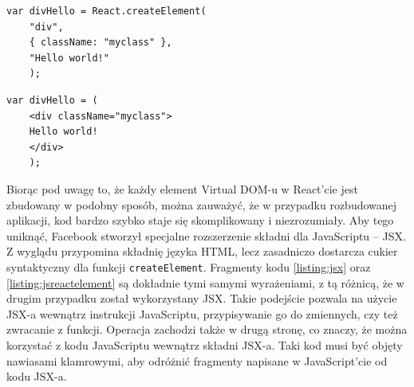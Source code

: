 \begin{minipage}{.45\textwidth}
	\begin{lstlisting}[caption=Javascript,style=JavaScript,label = listing:jsreactelement]
	var divHello = React.createElement(
	"div",
	{ className: "myclass" },
	"Hello world!"
	);
	\end{lstlisting}
\end{minipage}\hfill
\begin{minipage}{.45\textwidth}
	\begin{lstlisting}[caption=JSX,style=JavaScript,firstnumber=1,label = listing:jsx]
	var divHello = (
	<div className="myclass">
	Hello world!
	</div>
	);
	\end{lstlisting}
\end{minipage}

Biorąc pod uwagę to, że każdy element Virtual DOM-u w React'cie jest zbudowany w podobny sposób, można zauważyć, że w przypadku rozbudowanej aplikacji, kod bardzo szybko staje się skomplikowany i niezrozumiały. Aby tego uniknąć, Facebook stworzył specjalne rozszerzenie składni dla JavaScriptu -- JSX. Z wyglądu przypomina składnię języka HTML, lecz zasadniczo dostarcza cukier syntaktyczny dla funkcji \lstinline[style=JavaScript]{createElement}. Fragmenty kodu \ref{listing:jsx} oraz \ref{listing:jsreactelement} są dokładnie tymi samymi wyrażeniami, z tą różnicą, że w drugim przypadku został wykorzystany JSX. Takie podejście pozwala na użycie JSX-a wewnątrz instrukcji JavaScriptu, przypisywanie go do zmiennych, czy też zwracanie z funkcji. Operacja zachodzi także w drugą stronę, co znaczy, że można korzystać z kodu JavaScriptu wewnątrz składni JSX-a. Taki kod musi być objęty nawiasami klamrowymi, aby odróżnić fragmenty napisane w JavaScript'cie od kodu JSX-a. 

